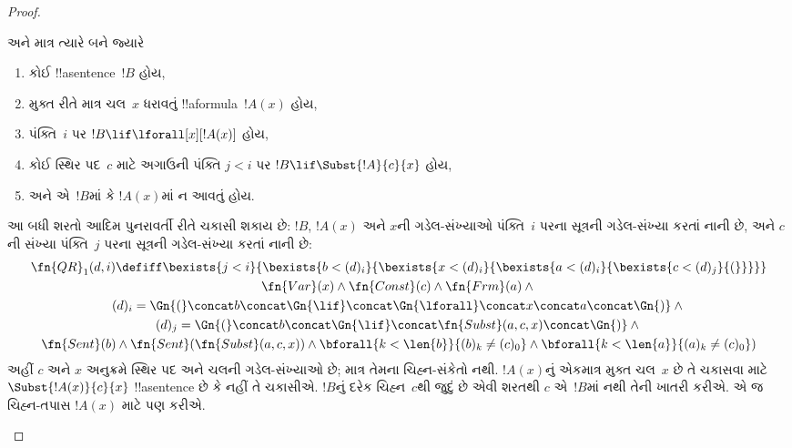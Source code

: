 \documentclass[../../../include/open-logic-section]{subfiles}
\begin{document}
\begin{proof}
\begin{enumerate}
  અને માત્ર ત્યારે બને જ્યારે
  \begin{enumerate}
  \item કોઈ !!a{sentence}~$!B$ હોય,
  \item મુક્ત રીતે માત્ર ચલ~$x$
    ધરાવતું !!a{formula}~$!A(x)$ હોય,
  \item પંક્તિ~$i$ પર
    $!B \lif \lforall[x][!A(x)]$ હોય,
  \item કોઈ સ્થિર પદ~$c$ માટે અગાઉની
    પંક્તિ $j < i$ પર
    $!B \lif \Subst{!A}{c}{x}$ હોય,
  \item અને એ~$!B$માં કે $!A(x)$માં ન આવતું હોય.
  \end{enumerate}
  આ બધી શરતો આદિમ પુનરાવર્તી રીતે
  ચકાસી શકાય છે: $!B$, $!A(x)$
  અને $x$ની ગડેલ-સંખ્યાઓ પંક્તિ~$i$
  પરના સૂત્રની ગડેલ-સંખ્યા કરતાં
  નાની છે, અને $c$ની સંખ્યા
  પંક્તિ~$j$ પરના સૂત્રની ગડેલ-સંખ્યા
  કરતાં નાની છે:
  \begin{multline*}
    \fn{QR}_1(d, i) \defiff \bexists{j<i}{\bexists{b < (d)_i}{\bexists{x <
        (d)_i}{\bexists{a < (d)_i}{\bexists{c < (d)_j}{(}}}}}
    \\ \fn{Var}(x) \land \fn{Const}(c) \land \fn{Frm}(a) \land {} \\
    (d)_i = \Gn{(} \concat
    b \concat \Gn{\lif} \concat \Gn{\lforall} \concat x \concat a
    \concat \Gn{)} \land {}\\
    (d)_j = \Gn{(} \concat b \concat
    \Gn{\lif} \concat \fn{Subst}(a,c,x) \concat \Gn{)} \land {}\\ \fn{Sent}(b)
    \land \fn{Sent}(\fn{Subst}(a,c,x)) \land {} \bforall{k <
      \len{b}}{(b)_k \neq (c)_0} \land
      \bforall{k < \len{a}}{(a)_k \neq (c)_0})
  \end{multline*}
  અહીં $c$ અને $x$ અનુક્રમે
  સ્થિર પદ અને ચલની ગડેલ-સંખ્યાઓ છે;
  માત્ર તેમના ચિહ્ન-સંકેતો નથી.
  $!A(x)$નું એકમાત્ર મુક્ત ચલ~$x$
  છે તે ચકાસવા માટે
  $\Subst{!A(x)}{c}{x}$
  !!a{sentence} છે કે નહીં તે ચકાસીએ.
  $!B$નું દરેક ચિહ્ન~$c$થી જુદું છે
  એવી શરતથી $c$ એ~$!B$માં નથી
  તેની ખાતરી કરીએ. એ જ ચિહ્ન-તપાસ $!A(x)$ માટે પણ કરીએ.


\end{enumerate}
\end{proof}
\end{document}
